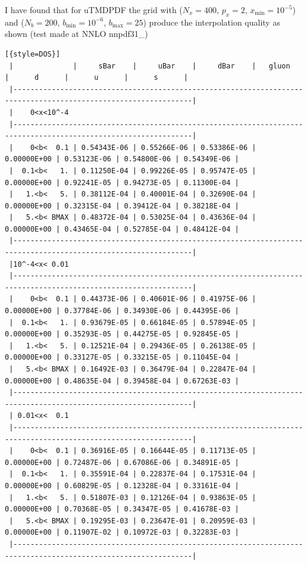 \documentclass[prd,nofootinbib,eqsecnum,final]{revtex4}
\renewcommand{\(}{\left(}
\renewcommand{\)}{\right)}
\renewcommand{\[}{\left[}
\renewcommand{\]}{\right]}
\begin{document}
I have found that for uTMDPDF the grid with ($N_x=400$, $p_x=2$, $x_{\min}=10^{-5}$) and ($N_b=200$, $b_{\min}=10^{-6}$, $b_{\max}=25$) produce the interpolation quality as shown (test made at NNLO nnpdf31\_\nnlo)
\begin{lstlisting}[{style=DOS}]
 |              |     sBar    |     uBar    |     dBar    |   gluon     |      d      |      u      |      s      |
 |----------------------------------------------------------------------------------------------------------------|
 |    0<x<10^-4
 |----------------------------------------------------------------------------------------------------------------|
 |    0<b<  0.1 | 0.54343E-06 | 0.55266E-06 | 0.53386E-06 | 0.00000E+00 | 0.53123E-06 | 0.54800E-06 | 0.54349E-06 |
 |  0.1<b<   1. | 0.11250E-04 | 0.99226E-05 | 0.95747E-05 | 0.00000E+00 | 0.92241E-05 | 0.94273E-05 | 0.11300E-04 |
 |   1.<b<   5. | 0.38112E-04 | 0.40001E-04 | 0.32690E-04 | 0.00000E+00 | 0.32315E-04 | 0.39412E-04 | 0.38218E-04 |
 |   5.<b< BMAX | 0.48372E-04 | 0.53025E-04 | 0.43636E-04 | 0.00000E+00 | 0.43465E-04 | 0.52785E-04 | 0.48412E-04 |
 |----------------------------------------------------------------------------------------------------------------|
 |10^-4<x< 0.01
 |----------------------------------------------------------------------------------------------------------------|
 |    0<b<  0.1 | 0.44373E-06 | 0.40601E-06 | 0.41975E-06 | 0.00000E+00 | 0.37784E-06 | 0.34930E-06 | 0.44395E-06 |
 |  0.1<b<   1. | 0.93679E-05 | 0.66184E-05 | 0.57894E-05 | 0.00000E+00 | 0.35293E-05 | 0.44275E-05 | 0.92845E-05 |
 |   1.<b<   5. | 0.12521E-04 | 0.29436E-05 | 0.26138E-05 | 0.00000E+00 | 0.33127E-05 | 0.33215E-05 | 0.11045E-04 |
 |   5.<b< BMAX | 0.16492E-03 | 0.36479E-04 | 0.22847E-04 | 0.00000E+00 | 0.48635E-04 | 0.39458E-04 | 0.67263E-03 |
 |----------------------------------------------------------------------------------------------------------------|
 | 0.01<x<  0.1
 |----------------------------------------------------------------------------------------------------------------|
 |    0<b<  0.1 | 0.36916E-05 | 0.16644E-05 | 0.11713E-05 | 0.00000E+00 | 0.72487E-06 | 0.67086E-06 | 0.34891E-05 |
 |  0.1<b<   1. | 0.35591E-04 | 0.22837E-04 | 0.17531E-04 | 0.00000E+00 | 0.60829E-05 | 0.12328E-04 | 0.33161E-04 |
 |   1.<b<   5. | 0.51807E-03 | 0.12126E-04 | 0.93863E-05 | 0.00000E+00 | 0.70368E-05 | 0.34347E-05 | 0.41678E-03 |
 |   5.<b< BMAX | 0.19295E-03 | 0.23647E-01 | 0.20959E-03 | 0.00000E+00 | 0.11907E-02 | 0.10972E-03 | 0.32283E-03 |
 |----------------------------------------------------------------------------------------------------------------|

\end{lstlisting}
\end{document}
